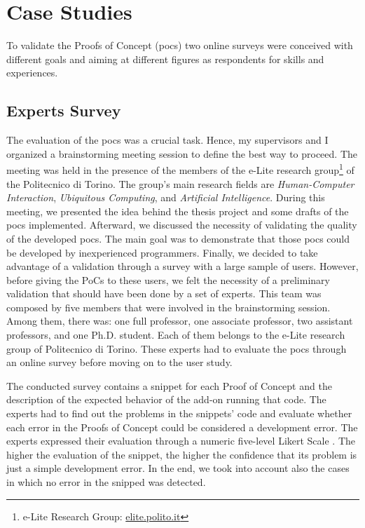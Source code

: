\chapter{Case Studies}
\label{experiments}

To validate the Proofs of Concept (\glspl{poc}) two online surveys were conceived with different goals and aiming at different figures as respondents for skills and experiences.

\section{Experts Survey}
\label{sec:expert_surv}

The evaluation of the \glspl{poc} was a crucial task. Hence, my supervisors and I organized a brainstorming meeting session to define the best way to proceed. The meeting was held in the presence of the members of the e-Lite research group\footnote{e-Lite Research Group: \href{https://elite.polito.it}{elite.polito.it}} of the Politecnico di Torino. The group's main research fields are \textit{Human-Computer Interaction}, \textit{Ubiquitous Computing}, and \textit{Artificial Intelligence}. During this meeting, we presented the idea behind the thesis project and some drafts of the \glspl{poc} implemented. Afterward, we discussed the necessity of validating the quality of the developed \glspl{poc}. The main goal was to demonstrate that those \glspl{poc} could be developed by inexperienced programmers. Finally, we decided to take advantage of a validation through a survey with a large sample of users. However, before giving the PoCs to these users, we felt the necessity of a preliminary validation that should have been done by a set of experts. This team was composed by five members that were involved in the brainstorming session. Among them, there was: one full professor, one associate professor, two assistant professors, and one Ph.D. student. Each of them belongs to the e-Lite research group of Politecnico di Torino.
These experts had to evaluate the \glspl{poc} through an online survey before moving on to the user study.

The conducted survey contains a snippet for each Proof of Concept and the description of the expected behavior of the add-on running that code. The experts had to find out the problems in the snippets' code and evaluate whether each error in the Proofs of Concept could be considered a development error. The experts expressed their evaluation through a numeric five-level Likert Scale \cite{joshi2015likert}. The higher the evaluation of the snippet, the higher the confidence that its problem is just a simple development error. In the end, we took into account also the cases in which no error in the snipped was detected.




